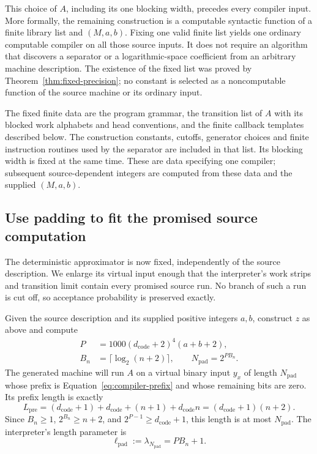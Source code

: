 This choice of $A$, including its one blocking width, precedes every
compiler input.  More formally, the remaining construction is a
computable syntactic function of a finite library list and
$(M,a,b)$.  Fixing one valid finite list yields one ordinary
computable compiler on all those source inputs.  It does not require
an algorithm that discovers a separator or a logarithmic-space
coefficient from an arbitrary machine description.  The existence
of the fixed list was proved by Theorem~\ref{thm:fixed-precision};
no constant is selected as a noncomputable function of the source
machine or its ordinary input.

The fixed finite data are the program grammar, the transition list of
$A$ with its blocked work alphabets and head conventions, and the
finite callback templates described below. The construction constants,
cutoffs, generator choices and finite instruction routines used by the
separator are included in that list. Its blocking width is fixed at
the same time. These are data specifying one compiler; subsequent
source-dependent integers are computed from these data and the supplied
$(M,a,b)$.

\subsection{Use padding to fit the promised source computation}
\label{subsec:compiler-padding}

The deterministic approximator is now fixed, independently of the source description. We enlarge its virtual input enough that the interpreter's work strips and transition limit contain every promised source run. No branch of such a run is cut off, so acceptance probability is preserved exactly.

Given the source description and its supplied positive integers $a,b$, construct $z$ as above and compute
\begin{equation}\label{eq:compiler-padding}
 \begin{split}
 P&=1000(d_{\mathrm{code}}+2)^4(a+b+2),\\
 B_n&=\lceil\log_2(n+2)\rceil,
 \qquad N_{\mathrm{pad}}=2^{PB_n}.
 \end{split}
\end{equation}
The generated machine will run $A$ on a virtual binary input
$y_x$ of length $N_{\mathrm{pad}}$ whose prefix is
Equation~\eqref{eq:compiler-prefix} and whose remaining bits are zero.
Its prefix length is exactly
\begin{equation}\label{eq:compiler-prefix-length}
 L_{\mathrm{pre}}
 =(d_{\mathrm{code}}+1)+d_{\mathrm{code}}+(n+1)
       +d_{\mathrm{code}}n
 =(d_{\mathrm{code}}+1)(n+2).
\end{equation}
Since $B_n\ge1$, $2^{B_n}\ge n+2$, and
$2^{P-1}\ge d_{\mathrm{code}}+1$, this length is at most
$N_{\mathrm{pad}}$.  The interpreter's length parameter is
\begin{equation}\label{eq:compiler-padded-log}
 \ell_{\mathrm{pad}}
 :=\lambda_{N_{\mathrm{pad}}}=PB_n+1.
\end{equation}

